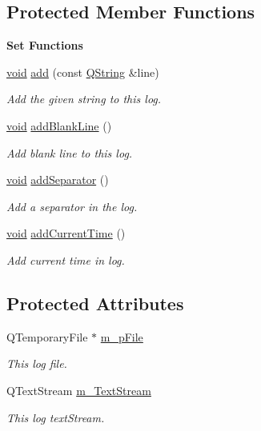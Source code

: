 \subsection*{Protected Member Functions}
\begin{Indent}{\bf Set Functions}\par
\begin{DoxyCompactItemize}
\item 
\hyperlink{group___u_a_v_objects_plugin_ga444cf2ff3f0ecbe028adce838d373f5c}{void} \hyperlink{class_g_l_c___log_ad39c9f31af5f63663829caf6055a1528}{add} (const \hyperlink{group___u_a_v_objects_plugin_gab9d252f49c333c94a72f97ce3105a32d}{Q\-String} \&line)
\begin{DoxyCompactList}\small\item\em Add the given string to this log. \end{DoxyCompactList}\item 
\hyperlink{group___u_a_v_objects_plugin_ga444cf2ff3f0ecbe028adce838d373f5c}{void} \hyperlink{class_g_l_c___log_a164ab5fd4ecc27bdcef4446f80c6ed21}{add\-Blank\-Line} ()
\begin{DoxyCompactList}\small\item\em Add blank line to this log. \end{DoxyCompactList}\item 
\hyperlink{group___u_a_v_objects_plugin_ga444cf2ff3f0ecbe028adce838d373f5c}{void} \hyperlink{class_g_l_c___log_a4e83931ca0076d1fa048cd437da96068}{add\-Separator} ()
\begin{DoxyCompactList}\small\item\em Add a separator in the log. \end{DoxyCompactList}\item 
\hyperlink{group___u_a_v_objects_plugin_ga444cf2ff3f0ecbe028adce838d373f5c}{void} \hyperlink{class_g_l_c___log_af9a2939fd382433a9d01c473760f3e14}{add\-Current\-Time} ()
\begin{DoxyCompactList}\small\item\em Add current time in log. \end{DoxyCompactList}\end{DoxyCompactItemize}
\end{Indent}
\subsection*{Protected Attributes}
\begin{DoxyCompactItemize}
\item 
Q\-Temporary\-File $\ast$ \hyperlink{class_g_l_c___log_a1a53b65e0ca8d561f036a6d82ddcb2a6}{m\-\_\-p\-File}
\begin{DoxyCompactList}\small\item\em This log file. \end{DoxyCompactList}\item 
Q\-Text\-Stream \hyperlink{class_g_l_c___log_a8fd0fa264b69ab1ee2d68fedd370834c}{m\-\_\-\-Text\-Stream}
\begin{DoxyCompactList}\small\item\em This log text\-Stream. \end{DoxyCompactList}\end{DoxyCompactItemize}
